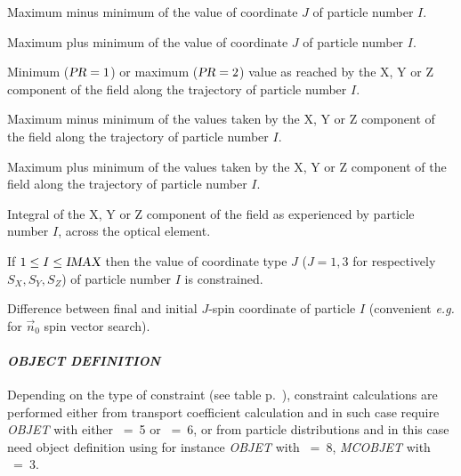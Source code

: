  Maximum minus minimum of the value of coordinate $J$ of particle number $I$. 

\smallskip

 Maximum plus minimum of the value of coordinate $J$ of particle number $I$. 

\smallskip

 Minimum ($\textsl{PR}=1$) or maximum ($\textsl{PR}=2$) value as reached by the X, Y or Z component 
of the field along the trajectory of particle number $I$.

\smallskip

 Maximum minus minimum of the values taken by the X, Y or Z component 
of the field along the trajectory of particle number $I$.

\smallskip

 Maximum plus minimum of the values taken by the X, Y or Z component 
of the field along the trajectory of particle number $I$.

\smallskip

 Integral of the X, Y or Z component of the field as experienced by 
particle number $I$, across the optical element. 


\smallskip

 If $1\leq I\leq \textsl{IMAX}$ then the value of coordinate type $J$ ($J=1,3$ for respectively 
 $S_X, S_Y, S_Z$) of particle number $I$ is constrained.  

\smallskip

 Difference between final and initial $J$-spin coordinate  of particle $I$ (convenient 
\emph{e.g.} for $\vec n_0$ spin vector search).   





\paragraph{\textit{OBJECT DEFINITION}}


\noindent Depending on the type of constraint (see table p.~\pageref{TabFITZlst1}), constraint calculations are performed either from 
transport coefficient calculation and in such case require  \textsl{OBJET} with either \KOBJ~=~5  
or  \KOBJ~=~6, or from particle distributions and in this case need  object definition using for 
instance \textsl{OBJET} with \KOBJ~=~8,    \textsl{MCOBJET} with  \KOBJ~=~3. 

